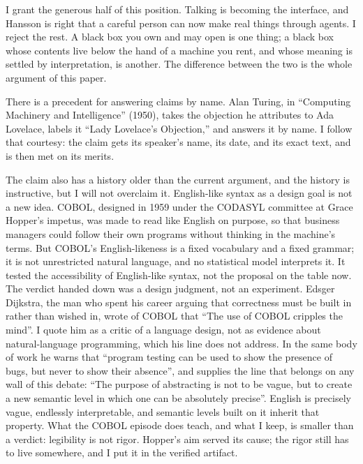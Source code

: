 \documentclass[11pt]{article}
\begin{document}
I grant the generous half of this position. Talking is
becoming the interface, and Hansson is right that a careful person can
now make real things through agents. I reject the rest. A black box
you own and may open is one thing; a black box whose contents live
below the hand of a machine you rent, and whose meaning is settled by
interpretation, is another. The difference between the two is the
whole argument of this paper.

There is a precedent for answering claims by name. Alan Turing, in
``Computing Machinery and Intelligence'' (1950), takes the objection
he attributes to Ada Lovelace, labels it ``Lady Lovelace's
Objection,'' and answers it by name. I follow that courtesy:
the claim gets its speaker's name, its date, and its exact text, and
is then met on its merits\cite{turing50}.

The claim also has a history older than the current argument, and the
history is instructive, but I will not overclaim it. English-like
syntax as a design goal is not a new idea. COBOL, designed in 1959
under the CODASYL committee at Grace Hopper's impetus, was made to
read like English on purpose, so that business managers could follow
their own programs without thinking in the machine's
terms\cite{cobol1959}. But COBOL's English-likeness is a fixed
vocabulary and a fixed grammar; it is not unrestricted natural
language, and no statistical model interprets it. It tested the
accessibility of English-like syntax, not the proposal on the table
now. The verdict handed down was a design judgment, not an
experiment. Edsger Dijkstra, the man who spent his
career arguing that correctness must be built in rather than wished
in, wrote of COBOL that ``The use of COBOL cripples the
mind''\cite{dijkstra75}. I quote him as a critic of a language design,
not as evidence about natural-language programming, which his line
does not address. In the same body of work he warns that
``program testing can be used to show the presence of bugs, but never
to show their absence''\cite{dijkstra70}, and supplies the line that
belongs on any wall of this debate: ``The purpose of abstracting is
not to be vague, but to create a new semantic level in which one can
be absolutely precise''\cite{dijkstra72}. English is precisely vague,
endlessly interpretable, and semantic levels built on it inherit that
property. What the COBOL episode does teach, and what I keep, is
smaller than a verdict: legibility is not rigor. Hopper's aim served
its cause; the rigor still has to live somewhere, and I put it in the
verified artifact.
\end{document}
